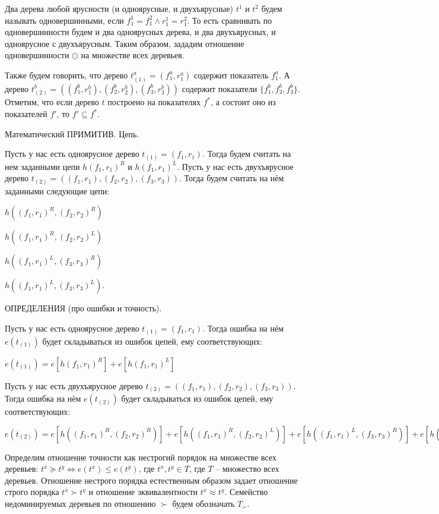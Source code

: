 \documentclass[12pt]{a&t}
\begin{document}
Два дерева любой ярусности (и одноярусные, и двухъярусные) $t^1$ и $t^2$ будем называть одновершинными, если $f^1_1 = f^2_1 \land r^1_1 = r^2_1$.  То есть сравнивать по одновершинности будем и два одноярусных дерева, и два двухъярусных, и одноярусное с двухъярусным. Таким образом, зададим отношение одновершинности $\odot$ на множестве всех деревьев. 

Также будем говорить, что дерево $t_{(1)}^a = (f_1^a, r_1^a)$ содержит показатель $f^a_1$. А дерево $t_{(2)}^b = ((f_1^b, r_1^b), (f_2^b, r_2^b), (f_3^b, r_3^b)) $ содержит показатели $\{ f^b_1, f^b_2, f^b_3 \} $. Отметим, что если дерево $t$ построено на показателях $f^*$, а состоит оно из показателей $f'$, то $f' \subseteq f^*$.

Математический ПРИМИТИВ. Цепь.

Пусть у нас есть  одноярусное дерево $t_{(1)} = (f_1, r_1)$.  Тогда будем считать на нем заданными цепи $h(f_1, r_1)^R$ и $h(f_1, r_1)^L$. Пусть у нас есть двухъярусное дерево $t_{(2)} = ((f_1, r_1), (f_2, r_2), (f_3, r_3))$. Тогда будем считать на нём заданными следующие цепи: 

$h((f_1, r_1)^R, (f_2, r_2)^R)$

$h((f_1, r_1)^R, (f_2, r_2)^L)$

$h((f_1, r_1)^L, (f_3, r_3)^R)$

$h((f_1, r_1)^L, (f_3, r_3)^L)$.



ОПРЕДЕЛЕНИЯ (про ошибки и точность). 

Пусть у нас есть одноярусное дерево $t_{(1)} = (f_1, r_1)$. Тогда ошибка на нём $e(t_{(1)})$ будет складываться из ошибок цепей, ему соответствующих:

$e(t_{(1)}) = e[h(f_1, r_1)^R] + e[h(f_1, r_1)^L]$

Пусть у нас есть двухъярусное дерево $t_{(2)} = ((f_1, r_1), (f_2, r_2), (f_3, r_3))$. Тогда ошибка на нём $e(t_{(2)})$ будет складываться из ошибок цепей, ему соответствующих:

$e(t_{(2)}) = e[h((f_1, r_1)^R, (f_2, r_2)^R)] + e[h((f_1, r_1)^R, (f_2, r_2)^L)] + e[h((f_1, r_1)^L, (f_3, r_3)^R)] + e[h((f_1, r_1)^L, (f_3, r_3)^L)]$

Определим отношение точности как нестрогий порядок на множестве всех деревьев: $t^x \succeq t^y \Leftrightarrow e(t^x) \leqslant e(t^y)$, где $t^x, t^y \in T$, где $T$ -- множество всех деревьев. Отношение нестрого порядка естественным образом задает отношение строго порядка $t^x  \succ t^y$ и отношение эквивалентности $t^x \approx t^y$.  Семейство недоминируемых деревьев по отношению $\succ$ будем обозначать $T_{\succ}$.
\end{document}
